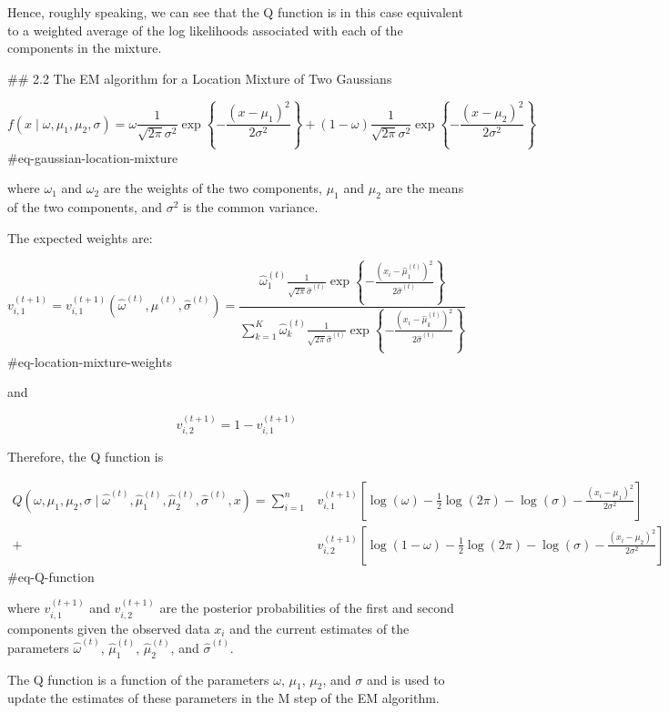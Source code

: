 Hence, roughly speaking, we can see that the Q function is in this case equivalent to a weighted average of the log likelihoods associated with each of the components in the mixture.

## 2.2 The EM algorithm for a Location Mixture of Two Gaussians

$$
f(x\mid \omega, \mu_1,\mu_2, \sigma) = \omega \frac{1}{\sqrt{2\pi}\sigma^2} \exp\left\{ -\frac{(x - \mu_1)^2}{2\sigma^2} \right\} + (1-\omega) \frac{1}{\sqrt{2\pi}\sigma^2} \exp\left\{ -\frac{(x - \mu_2)^2}{2\sigma^2} \right\}
$$ {#eq-gaussian-location-mixture}

where $\omega_1$ and $\omega_2$ are the weights of the two components, $\mu_1$ and $\mu_2$ are the means of the two components, and $\sigma^2$ is the common variance.

The expected weights are:

$$
v^{(t+1)}_{i,1} =v^{(t+1)}_{i,1} \left (\hat{\omega}^{(t)},\hat{\mu}^{(t)},\hat{\sigma}^{(t)}\right)=\frac{\hat{\omega}^{(t)}_1 \frac{1}{\sqrt{2\pi}\hat{\sigma}^{(t)}} \exp\left\{ -\frac{(x_i - \hat{\mu}^{(t)}_1)^2}{2\hat{\sigma}^{(t)}} \right\}}{\sum_{k=1}^K \hat{\omega}^{(t)}_k \frac{1}{\sqrt{2\pi}\hat{\sigma}^{(t)}} \exp\left\{ -\frac{(x_i - \hat{\mu}^{(t)}_k)^2}{2\hat{\sigma}^{(t)}} \right\}}
$$ {#eq-location-mixture-weights}

and

$$
v^{(t+1)}_{i,2} = 1 - v^{(t+1)}_{i,1}
$$

Therefore, the Q function is

$$
\begin{aligned}
Q(\omega, \mu_1, \mu_2, \sigma \mid \hat{\omega}^{(t)}, \hat{\mu}^{(t)}_1,\hat{\mu}^{(t)}_2, \hat{\sigma}^{(t)}, x) = \sum_{i=1}^n & v_{i,1}^{(t+1)} \left [\log(\omega) - \frac{1}{2} \log(2\pi) - \log(\sigma) - \frac{(x_i - \mu_1)^2}{2\sigma^2}\right ] \\
+ & v_{i,2}^{(t+1)} \left [\log(1-\omega) - \frac{1}{2} \log(2\pi) - \log(\sigma) - \frac{(x_i - \mu_2)^2}{2\sigma^2}\right] 
\end{aligned}
$$ {#eq-Q-function}

where $v_{i,1}^{(t+1)}$ and $v_{i,2}^{(t+1)}$ are the posterior probabilities of the first and second components given the observed data $x_i$ and the current estimates of the parameters $\hat{\omega}^{(t)}$, $\hat{\mu}^{(t)}_1$, $\hat{\mu}^{(t)}_2$, and $\hat{\sigma}^{(t)}$.

The Q function is a function of the parameters $\omega$, $\mu_1$, $\mu_2$, and $\sigma$ and is used to update the estimates of these parameters in the M step of the EM algorithm.

